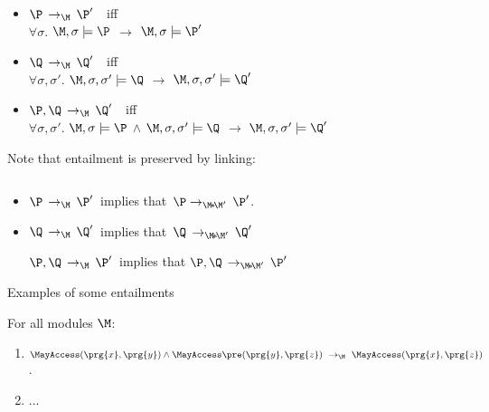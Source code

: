 \begin{definition}[Entailment]
$ $ \\

\begin{itemize}
\item
$\P\, \rightarrow_\M\, \P'$\ \  iff\ \\
$\forall  \sigma$. $\M, \sigma \models  \P$    $\rightarrow$ $\M,  \sigma \models  \P'$
\item
$\Q\, \rightarrow_\M\, \Q'$\ \  iff\ \\
$\forall  \sigma, \sigma'$.  $\M, \sigma, \sigma' \models  \Q$ $\rightarrow$ $\M, \sigma, \sigma' \models  \Q'$ 
\item
$\P, \Q\, \rightarrow_\M\, \Q'$\ \  iff\ \\
$\forall  \sigma, \sigma'$. $\M, \sigma \models  \P$  $\wedge$ $\M, \sigma, \sigma' \models  \Q$ $\rightarrow$ $\M, \sigma, \sigma' \models  \Q'$
\end{itemize}
\end{definition}

 

Note that   entailment is preserved by linking:
\begin{lemma}
$ $ \\

\begin{itemize}
\item
$\P\, \rightarrow_\M\, \P'$\ implies that\  $\P  \rightarrow_{\M\!*\!\M'}\, \P'$.
\item
$\Q\, \rightarrow_\M\, \Q'$\ implies that\  $\Q\, \rightarrow_{\M\!*\!\M'}\,  \Q'$

$\P, \Q\, \rightarrow_\M\, \P'$\   implies that  $\P, \Q\, \rightarrow_{\M\!*\!\M'}\, \P'$\
\end{itemize}
\end{lemma}

Examples of some entailments

\begin{lemma}[Entailments] For all modules $\M$:
$ ~ $

\begin{enumerate}
\item
$ \MayAccess(\prg{x},\prg{y}) \wedge \MayAccess\pre({\prg{y},\prg{z}}) \ \rightarrow_\M \ \MayAccess(\prg{x},\prg{z}) $.
\item
...
\end{enumerate}

\end{lemma}

